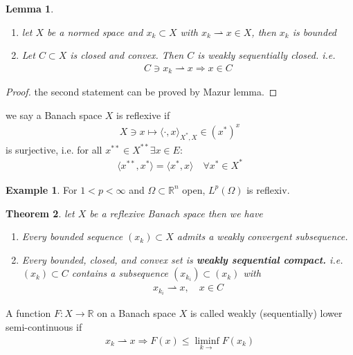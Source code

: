 \documentclass[a4paper,11pt,fleqn]{book}
\newtheorem{theorem}{Theorem}[section]
\newtheorem{lemma}[theorem]{Lemma}
\theoremstyle{definition}
\newtheorem*{example}{Example}
\theoremstyle{remark}
\begin{document}
\begin{lemma}\quad
	\begin{enumerate}
		\item let $X$ be a normed space and $x_k \subset X$ with $x_k \rightharpoonup x \in X$, then $x_k$ is bounded
		\item Let $C \subset X$ is closed and convex. Then $C$ is weakly sequentially closed. i.e.
		\begin{align*}
			C\ni x_k \rightharpoonup x \Rightarrow x \in C
		\end{align*}
	\end{enumerate}
\end{lemma}
\begin{proof}
the second statement can be proved by Mazur lemma. 
\end{proof}

we say a Banach space $X$ is reflexive if 
\begin{align*}
	X \ni x \mapsto \langle \cdot , x\rangle_{X^*, X} \in (x^*)^x
\end{align*}
is surjective, i.e. for all $x^{**} \in X^{**} \exists x \in E:$
\begin{align*}
	\langle x^{**}, x^*\rangle = \langle x^*, x\rangle  \quad \forall x^* \in X^*
\end{align*}

\begin{example}
 For $1 < p < \infty$ and $\Omega \subset \mathbb{R}^n$ open, $L^p(\Omega)$ is reflexiv. 
\end{example}

\begin{theorem}
	let $X$ be a reflexive Banach space then we have
	\begin{enumerate}
		\item Every bounded sequence $(x_k) \subset X$ admits a weakly convergent subsequence. 
		\item Every bounded, closed, and convex set is \textbf{weakly sequential compact.} i.e. $(x_k) \subset C$ contains a subsequence $(x_{k_i}) \subset (x_k)$ with
		\begin{align*}
			x_{k_i} \rightharpoonup x, \quad x \in C
		\end{align*} 
	\end{enumerate}
\end{theorem}

A function $F: X \rightarrow \mathbb{R}$ on a Banach space $X$ is called weakly (sequentially) lower semi-continuous if 
\begin{align*}
	x_k \rightharpoonup x \Rightarrow F(x) \le \liminf_{k \rightarrow} F(x_k)
\end{align*}
\end{document}
